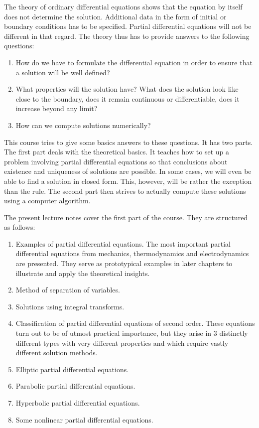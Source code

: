 The theory of ordinary differential equations shows that the equation
by itself does not determine the solution.
Additional data in the form of initial or boundary conditions has to be
specified.
Partial differential equations will not be different in that regard.
The theory thus has to provide answers to the following questions:
\begin{enumerate}
\item
How do we have to formulate the differential equation in order to ensure
that a solution will be well defined?
\item
What properties will the solution have?
What does the solution look like close to the boundary, does it remain
continuous or differentiable, does it increase beyond any limit?
\item
How can we compute solutions numerically?
\end{enumerate}
This course tries to give some basics answers to these questions.
It has two parts.
The first part deals with the theoretical basics.
It teaches how to set up a problem involving partial differential equations
so that conclusions about existence and uniqueness of solutions are possible.
In some cases, we will even be able to find a solution in closed form.
This, however, will be rather the exception than the rule.
The second part then strives to actually compute these solutions using
a computer algorithm.

The present lecture notes cover the first part of the course.
They are structured as follows:
\begin{enumerate}
\item
Examples of partial differential equations.
The most important partial differential equations from mechanics,
thermodynamics and electrodynamics are presented.
They serve as prototypical examples in later chapters to illustrate
and apply the theoretical insights.
\item
Method of separation of variables.
\item
Solutions using integral transforms.
\item
Classification of partial differential equations of second order.
These equations turn out to be of utmost practical importance, but
they arise in 3 distinctly different types with very different properties
and which require vastly different solution methods.
\item
Elliptic partial differential equations.
\item
Parabolic partial differential equations.
\item
Hyperbolic partial differential equations.
\item
Some nonlinear partial differential equations.
\end{enumerate}


